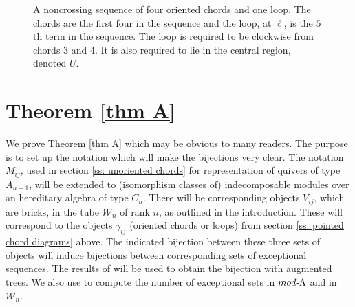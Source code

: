 \documentclass[11pt]{amsart}
\theoremstyle{definition}
\theoremstyle{remark}
\numberwithin{equation}{section}
\newcommand{\cW}{\ensuremath{{\mathcal{W}}}}
\begin{document}
%
%
\begin{figure}[htbp]
\begin{center}
\caption{A noncrossing sequence of four oriented chords and one loop. The chords are the first four in the sequence and the loop, at $\ell$, is the $5$th term in the sequence. The loop is required to be clockwise from chords 3 and 4. It is also required to lie in the central region, denoted $U$.}
\label{fig: example of chord diagram with loop}
\end{center}
\end{figure}
%




\section{Theorem \ref{thm A}}\label{sec: Theorem A}

We prove Theorem \ref{thm A} which may be obvious to many readers. The purpose is to set up the notation which will make the bijections very clear. The notation $M_{ij}$, used in section \ref{ss: unoriented chords} for representation of quivers of type $A_{n-1}$, will be extended to (isomorphism classes of) indecomposable modules over an hereditary algebra of type $C_n$. There will be corresponding objects $V_{ij}$, which are bricks, in the tube $\cW_n$ of rank $n$, as outlined in the introduction. These will correspond to the objects $\gamma_{ij}$ (oriented chords or loops) from section \ref{ss: pointed chord diagrams} above. The indicated bijection between these three sets of objects will induce bijections between corresponding sets of exceptional sequences. The results of \cite{Ig-Sen} will be used to obtain the bijection with augmented trees. We also use \cite{IM} to compute the number of exceptional sets in $mod\text-\Lambda$ and in $\cW_n$.
\end{document}
